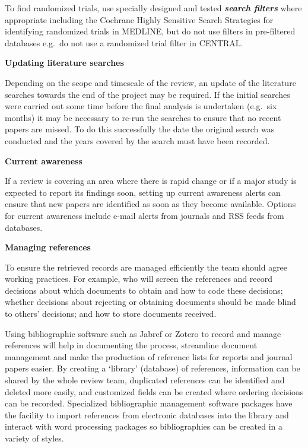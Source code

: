 \documentclass[
  11pt,
  a4paper,
  DIV=11,
  numbers=noendperiod]{scrreprt}
\begin{document}
To find randomized trials, use specially designed and tested
\textbf{\emph{search filters}} where appropriate including the Cochrane
Highly Sensitive Search Strategies for identifying randomized trials in
MEDLINE, but do not use filters in pre-filtered databases e.g.~do not
use a randomized trial filter in CENTRAL.

\textbf{Updating literature searches}

Depending on the scope and timescale of the review, an update of the
literature searches towards the end of the project may be required. If
the initial searches were carried out some time before the final
analysis is undertaken (e.g.~six months) it may be necessary to re-run
the searches to ensure that no recent papers are missed. To do this
successfully the date the original search was conducted and the years
covered by the search must have been recorded.

\textbf{Current awareness}

If a review is covering an area where there is rapid change or if a
major study is expected to report its findings soon, setting up current
awareness alerts can ensure that new papers are identified as soon as
they become available. Options for current awareness include e-mail
alerts from journals and RSS feeds from databases.

\textbf{Managing references}

To ensure the retrieved records are managed efficiently the team should
agree working practices. For example, who will screen the references and
record decisions about which documents to obtain and how to code these
decisions; whether decisions about rejecting or obtaining documents
should be made blind to others' decisions; and how to store documents
received.

Using bibliographic software such as Jabref or Zotero to record and
manage references will help in documenting the process, streamline
document management and make the production of reference lists for
reports and journal papers easier. By creating a `library' (database) of
references, information can be shared by the whole review team,
duplicated references can be identified and deleted more easily, and
customized fields can be created where ordering decisions can be
recorded. Specialized bibliographic management software packages have
the facility to import references from electronic databases into the
library and interact with word processing packages so bibliographies can
be created in a variety of styles.
\end{document}
